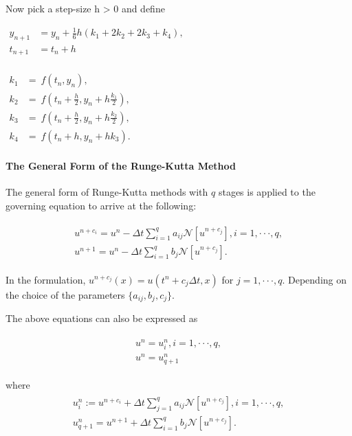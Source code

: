 \documentclass[book.tex]{subfiles}
\begin{document}
Now pick a step-size h \textgreater{} 0 and define

$\begin{aligned}y_{n+1}&=y_{n}+{\frac {1}{6}}h\left(k_{1}+2k_{2}+2k_{3}+k_{4}\right),\\t_{n+1}&=t_{n}+h\\\end{aligned}$

$
\begin{aligned}k_{1}&=\ f(t_{n},y_{n}),\\k_{2}&=\ f\left(t_{n}+{\frac {h}{2}},y_{n}+h{\frac {k_{1}}{2}}\right),\\k_{3}&=\ f\left(t_{n}+{\frac {h}{2}},y_{n}+h{\frac {k_{2}}{2}}\right),\\k_{4}&=\ f\left(t_{n}+h,y_{n}+hk_{3}\right).\end{aligned}
$
\paragraph{The General Form of the Runge-Kutta
Method}\label{the-general-runge-kutta-method}
The general form of Runge-Kutta methods with $q$ stages is applied to the governing equation to arrive at the following:

\begin{align}
    \begin{split}
        u^{n+c_i}=u^n-\Delta t\sum_{i=1}^{q}a_{ij}\mathcal{N}[u^{n+c_j}], i=1,\cdot\cdot\cdot,q,\\
        u^{n+1}=u^n-\Delta t\sum_{i=1}^{q}b_{j}\mathcal{N}[u^{n+c_j}].
    \end{split}
\end{align}

In the formulation, $u^{n+c_j}(x)=u(t^n+c_j\Delta t,x)$ for $j=1,\cdot\cdot\cdot,q$. Depending on the choice of the parameters $\{a_{ij},b_j,c_j\}$.

The above equations can also be expressed as

\begin{align}
    \begin{split}
        u^n=u^n_i, i=1,\cdot\cdot\cdot,q,\\
        u^n=u^n_{q+1}
    \end{split}
\end{align}

where
\begin{align}
    \begin{split}
        u_i^n:=u^{n+c_i}+\Delta t\sum_{j=1}^{q}a_{ij}\mathcal{N}[u^{n+c_j}], i=1,\cdot\cdot\cdot,q,\\
          u^{n}_{q+1}=u^{n+1}+\Delta t\sum_{i=1}^{q}b_{j}\mathcal{N}[u^{n+c_j}].
    \end{split}
\end{align}
\end{document}
